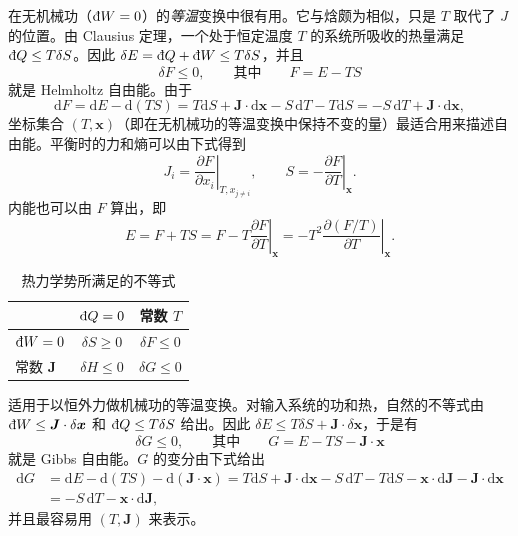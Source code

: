 在无机械功（$\inexd W=0$）的\emph{等温}变换中很有用。它与焓颇为相似，只是 $T$ 取代了 $J$ 的位置。由 Clausius 定理，一个处于恒定温度 $T$ 的系统所吸收的热量满足 $\inexd Q\le T\delta S$。因此 $\delta E=\inexd Q+\inexd W\le T\delta S$，并且
\begin{equation}
\delta F\le0,\qquad\text{其中}\qquad F=E-TS
\label{eq:1.34}
\end{equation}
就是 Helmholtz 自由能。由于
\begin{equation}
\mathrm{d}F=\mathrm{d}E-\mathrm{d}(TS)=T\mathrm{d}S+\bm{J}\cdot\mathrm{d}\bm{x}-S\,\mathrm{d}T-T\mathrm{d}S=-S\,\mathrm{d}T+\bm{J}\cdot\mathrm{d}\bm{x},
\label{eq:1.35}
\end{equation}
坐标集合 $(T,\bm{x})$（即在无机械功的等温变换中保持不变的量）最适合用来描述自由能。平衡时的力和熵可以由下式得到
\begin{equation}
J_i=\left.\frac{\partial F}{\partial x_i}\right|_{T,x_{j\neq i}},\qquad S=-\left.\frac{\partial F}{\partial T}\right|_{\bm{x}}.
\label{eq:1.36}
\end{equation}
内能也可以由 $F$ 算出，即
\begin{equation}
E=F+TS=F-T\left.\frac{\partial F}{\partial T}\right|_{\bm{x}}=-T^2\left.\frac{\partial(F/T)}{\partial T}\right|_{\bm{x}}.
\label{eq:1.37}
\end{equation}

\begin{table}[htbp]
  \centering
  \small
  \caption{热力学势所满足的不等式}
  \label{tab:1.2}
  \begin{tabular}{@{}lcc@{}}
    \toprule
     & $\inexd Q=0$ & 常数 $T$\\
    \midrule
    $\inexd W=0$ & $\delta S\ge0$ & $\delta F\le0$\\
    常数 $\bm{J}$ & $\delta H\le0$ & $\delta G\le0$\\
    \bottomrule
  \end{tabular}
\end{table}

适用于以恒外力做机械功的等温变换。对输入系统的功和热，自然的不等式由 $\inexd W\le\bm{J}\cdot\delta\bm{x}$ 和 $\inexd Q\le T\delta S$ 给出。因此 $\delta E\le T\delta S+\bm{J}\cdot\delta\bm{x}$，于是有
\begin{equation}
\delta G\le0,\qquad\text{其中}\qquad G=E-TS-\bm{J}\cdot\bm{x}
\label{eq:1.38}
\end{equation}
就是 Gibbs 自由能。$G$ 的变分由下式给出
\begin{equation}
\begin{aligned}
\mathrm{d}G&=\mathrm{d}E-\mathrm{d}(TS)-\mathrm{d}(\bm{J}\cdot\bm{x})=T\mathrm{d}S+\bm{J}\cdot\mathrm{d}\bm{x}-S\,\mathrm{d}T-T\mathrm{d}S-\bm{x}\cdot\mathrm{d}\bm{J}-\bm{J}\cdot\mathrm{d}\bm{x}\\
&=-S\,\mathrm{d}T-\bm{x}\cdot\mathrm{d}\bm{J},
\end{aligned}
\label{eq:1.39}
\end{equation}
并且最容易用 $(T,\bm{J})$ 来表示。

